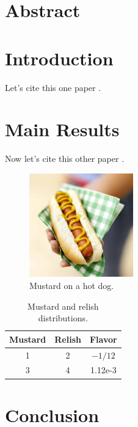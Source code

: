 \section*{Abstract}
  \lipsum[1]

\section{Introduction}
  \lipsum[2]
  Let's cite this one paper \cite{Greenbaum1993}.

\section{Main Results}
  \lipsum[1]
  Now let's cite this other paper \cite{Fix1973}.

  \begin{figure}
    \centering
    \includegraphics[width=0.4\textwidth]{src/paper2/figs/hotdog2.jpg}
    \caption{Mustard on a hot dog.}
  \end{figure}

  \lipsum[3]

  \begin{table}
    \centering
    \caption{Mustard and relish distributions.}
    \begin{tabular}{c|c|c}
      Mustard   &Relish   &Flavor \\
      \hline
      1   & 2   & $-1/12$ \\
      3   & 4   & 1.12e-3
    \end{tabular}
  \end{table}

\section{Conclusion}
  \lipsum[2]